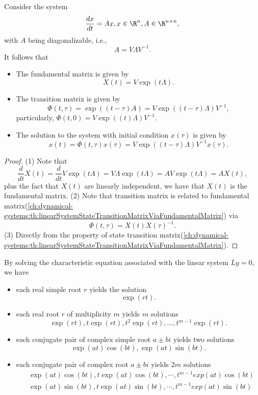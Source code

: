 \begin{refsection}
\begin{theorem}
	Consider the system
	$$\frac{dx}{dt} = Ax, x\in \R^n, A\in \R^{n\times n},$$
	with $A$ being diagonalizable, i.e.,
	$$A = V\Lambda V^{-1}.$$
It follows that
\begin{itemize}
	\item The fundamental matrix is given by
	$$X(t) = V\exp(t\Lambda).$$
	\item The transition matrix is given by
	$$\Phi(t,\tau) = \exp((t-\tau)A)= V\exp((t-\tau)\Lambda)V^{-1},$$
	particularly, $\Phi(t,0) = V\exp((t)\Lambda)V^{-1}.$
	\item The solution to the system with initial condition $x(\tau)$ is given by
	$$x(t) =\Phi(t,\tau)x(\tau) =V\exp((t-\tau)\Lambda)V^{-1} x(\tau).$$
\end{itemize}	
\end{theorem}
\begin{proof}
(1) Note that
$$\frac{d}{dt}X(t) = \frac{d}{dt}V\exp(t\Lambda) = V\Lambda\exp(t\Lambda) = AV\exp(t\Lambda) = AX(t),$$
plus the fact that $X(t)$ are linearly independent, we have that $X(t)$ is the fundamental matrix.
(2) Note that transition matrix is related to fundamental matrix(\autoref{ch:dynamical-systems:th:linearSystemStateTransitionMatrixViaFundamentalMatrix}) via
$$\Phi(t,\tau) = X(t)X(\tau)^{-1}.$$
(3)	Directly from the property of state transition matrix(\autoref{ch:dynamical-systems:th:linearSystemStateTransitionMatrixViaFundamentalMatrix}).
\end{proof}

\begin{note}
By solving the characteristic equation associated with the linear system $Ly = 0$, we have
\begin{itemize}
	\item each real simple root $r$ yields the solution 
	$$\exp(rt).$$
	\item each real root $r$ of multiplicity $m$ yields $m$ solutions 
	$$\exp(rt), t\exp(rt), t^2\exp(rt),...,t^{m-1}\exp(rt).$$
	\item each conjugate pair of complex simple root $a\pm bi$ yields two solutions 
	$$\exp(at)\cos(bt), \exp(at)\sin(bt).$$
	\item each conjugate pair of complex root $a\pm bi$ yields $2m$ solutions
	\begin{align*}
	&\exp(at)\cos(bt),t\exp(at)\cos(bt),\cdots,t^{m-1}exp(at)\cos(bt) \\
	&\exp(at)\sin(bt),t\exp(at)\sin(bt),\cdots,t^{m-1}exp(at)\sin(bt)
	\end{align*} 
\end{itemize}	
\end{note}



\end{refsection}
